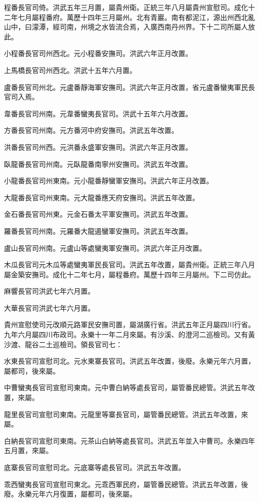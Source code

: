程番長官司倚。洪武五年三月置，屬貴州衛。正統三年八月屬貴州宣慰司。成化十二年七月屬程番府。萬歷十四年三月屬州。北有青巖。南有都泥江，源出州西北亂山中，曰濛潭，經司南，州境之水皆流合焉，入廣西南丹州界。下十二司所屬人放此。

小程番長官司州西北。元小程番安撫司。洪武六年正月改置。

上馬橋長官司州西北。洪武十五年六月置。

盧番長官司州北。元盧番靜海軍安撫司。洪武六年正月改置，省元盧番蠻夷軍民長官司入焉。

韋番長官司州南。元韋番蠻夷長官司。洪武十五年六月改置。

方番長官司州南。元方番河中府安撫司。洪武五年改置。

洪番長官司州西。元洪番永盛軍安撫司。洪武六年正月改置。

臥龍番長官司州南。元臥龍番南寧州安撫司。洪武五年改置。

小龍番長官司州東南。元小龍番靜蠻軍安撫司。洪武六年正月改置。

大龍番長官司州東南。元大龍番應天府安撫司。洪武五年改置。

金石番長官司州東。元金石番太平軍安撫司。洪武五年改置。

羅番長官司州南。元羅番大龍遏蠻軍安撫司。洪武五年改置。

盧山長官司州南。元盧山等處蠻夷軍安撫司。洪武六年正月改置。

木瓜長官司元木瓜等處蠻夷軍民長官司。洪武五年改置，屬貴州衛。正統三年八月屬金築安撫司。成化十二年七月，屬程番府。萬歷十四年三月屬州。下二司仿此。

麻響長官司洪武七年六月置。

大華長官司洪武七年六月置。

貴州宣慰使司元改順元路軍民安撫司置，屬湖廣行省。洪武五年正月屬四川行省。九年六月屬四川布政司。永樂十一年二月來屬。有沙溪、的澄河二巡檢司。又有黃沙渡、龍谷二土巡檢司。領長官司七：

水東長官司宣慰司北。元水東寨長官司。洪武五年改置，後廢。永樂元年六月置，屬都司，後來屬。

中曹蠻夷長官司宣慰司東南。元中曹白納等處長官司，屬管番民總管。洪武五年改置，來屬。

龍里長官司宣慰司東南。元龍里等寨長官司，屬管番民總管。洪武五年改置，來屬。

白納長官司宣慰司東南。元茶山白納等處長官司。洪武五年並入中曹司。永樂四年五月置，來屬。

底寨長官司宣慰司北。元底寨等處長官司。洪武五年改置。

乖西蠻夷長官司宣慰司東北。元乖西軍民府，屬管番民總管。洪武五年改置，後廢。永樂元年六月復置，屬都司，後來屬。

